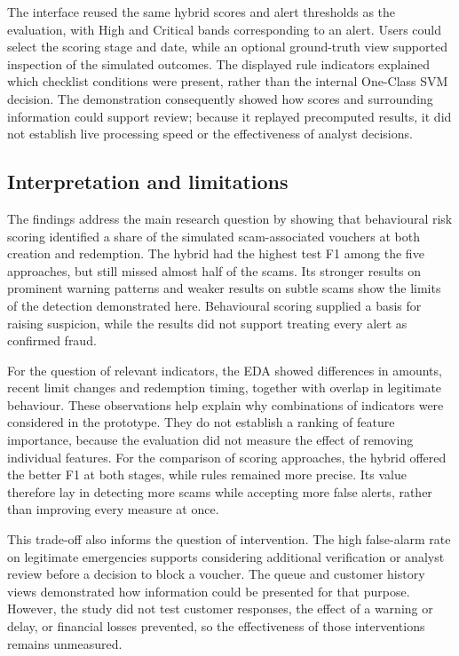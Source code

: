 \documentclass[a4paper,12pt]{article}
\begin{document}
The interface reused the same hybrid scores and alert thresholds as the evaluation, with High and Critical bands corresponding to an alert. Users could select the scoring stage and date, while an optional ground-truth view supported inspection of the simulated outcomes. The displayed rule indicators explained which checklist conditions were present, rather than the internal One-Class SVM decision. The demonstration consequently showed how scores and surrounding information could support review; because it replayed precomputed results, it did not establish live processing speed or the effectiveness of analyst decisions.

\FloatBarrier\subsection{Interpretation and limitations}

The findings address the main research question by showing that behavioural risk scoring identified a share of the simulated scam-associated vouchers at both creation and redemption. The hybrid had the highest test F1 among the five approaches, but still missed almost half of the scams. Its stronger results on prominent warning patterns and weaker results on subtle scams show the limits of the detection demonstrated here. Behavioural scoring supplied a basis for raising suspicion, while the results did not support treating every alert as confirmed fraud.

For the question of relevant indicators, the EDA showed differences in amounts, recent limit changes and redemption timing, together with overlap in legitimate behaviour. These observations help explain why combinations of indicators were considered in the prototype. They do not establish a ranking of feature importance, because the evaluation did not measure the effect of removing individual features. For the comparison of scoring approaches, the hybrid offered the better F1 at both stages, while rules remained more precise. Its value therefore lay in detecting more scams while accepting more false alerts, rather than improving every measure at once.

This trade-off also informs the question of intervention. The high false-alarm rate on legitimate emergencies supports considering additional verification or analyst review before a decision to block a voucher. The queue and customer history views demonstrated how information could be presented for that purpose. However, the study did not test customer responses, the effect of a warning or delay, or financial losses prevented, so the effectiveness of those interventions remains unmeasured.
\end{document}
